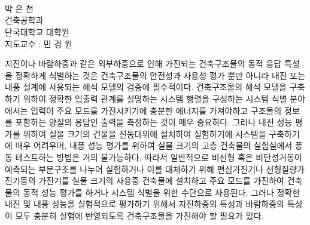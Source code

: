 \begin{center}
 \\
\vspace*{0.3cm}
 \\
\vspace*{0.3cm}
 \\

\end{center}
\begin{flushright}
박 은 천\\
건축공학과\\
단국대학교 대학원\\
\vspace{0.3cm}
지도교수 : 민 경 원
\end{flushright}

\setlength{\baselineskip}{1.5\baselineskip}
지진이나 바람하중과 같은 외부하중으로 인해 가진되는 건축구조물의 동적 응답 특성을 정확하게 식별하는 것은 건축구조물의 안전성과 사용성 평가 뿐만 아니라 내진 또는 내풍 설계에 사용되는 해석 모델의 검증에 필수적이다. 건축구조물의 해석 모델을 구축하기 위하여 정확한 입출력 관계를 설명하는 시스템 행렬을 구성하는 시스템 식별 분야에서는 입력이 주요 모드를 가진시키기에 충분한 에너지를 가져야하고 구조물의 정보를 포함하는 양질의 응답인 출력을 측정하는 것이 매우 중요하다. 그러나 내진 성능 평가를 위하여 실물 크기의 건물을 진동대위에 설치하여 실험하기에 시스템을 구축하기에 매우 어려우며, 내풍 성능 평가를 위하여 실물 크기의 고층 건축물의 실험실에서 풍동 테스트하는 방법은 거의 불가능하다. 따라서 일반적으로 비선형 혹은 비탄성거동이 예측되는 부분구조를 나누어 실험하거나 이를 대체하기 위해 편심가진기나 선형질량가진기등의 가진기를 실물 크기의 사용중 건축물에 설치하고 주요 모드를 가진하여 건축물의 동적 성능 평가를 하거나 시스템 식별을 위한 수단으로 사용된다. 그러나 정확한 내진 및 내풍 성능을 실험적으로 평가하기 위해서 지진하중의 특성과 바람하중의 특성이 모두 충분히 실험에 반영되도록 건축구조물을 가진해야 할 필요가 있다. 

